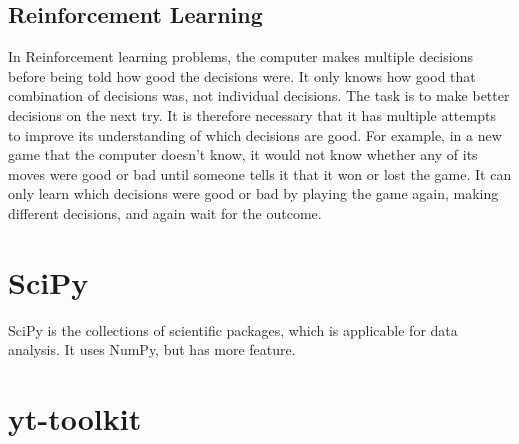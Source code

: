 \documentclass[10pt,a4paper]{article}
\begin{document}
\subsection{Reinforcement Learning}
In Reinforcement learning problems, the computer makes multiple decisions before being told how good the decisions were. It only knows how good that combination of decisions was, not individual decisions. The task is to make better decisions on the next try. It is therefore necessary that it has multiple attempts to improve its understanding of which decisions are good. For example, in a new game that the computer doesn't know, it would not know whether any of its moves were good or bad until someone tells it that it won or lost the game. It can only learn which decisions were good or bad by playing the game again, making different decisions, and again wait for the outcome.





\section{SciPy}

SciPy is the collections of scientific packages, which is applicable for data analysis. It uses NumPy, but has more feature.




















\section{yt-toolkit}






















\end{document}
